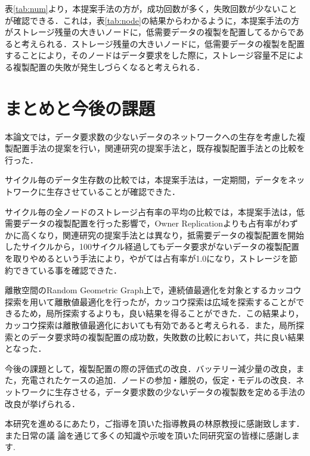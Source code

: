 \documentclass[11pt]{jreport}
\begin{document}
\par 表\ref{tab:num}より，本提案手法の方が，成功回数が多く，失敗回数が少ないことが確認できる．これは，表\ref{tab:node}の結果からわかるように，本提案手法の方がストレージ残量の大きいノードに，低需要データの複製を配置してるからであると考えられる．ストレージ残量の大きいノードに，低需要データの複製を配置することにより，そのノードはデータ要求をした際に，ストレージ容量不足による複製配置の失敗が発生しづらくなると考えられる．

\chapter{まとめと今後の課題}
本論文では，データ要求数の少ないデータのネットワークへの生存を考慮した複製配置手法の提案を行い，関連研究の提案手法と，既存複製配置手法との比較を行った．
\par サイクル毎のデータ生存数の比較では，本提案手法は，一定期間，データをネットワークに生存させていることが確認できた．
\par サイクル毎の全ノードのストレージ占有率の平均の比較では，本提案手法は，低需要データの複製配置を行った影響で，Owner Replicationよりも占有率がわずかに高くなり，関連研究の提案手法とは異なり，抵需要データの複製配置を開始したサイクルから，100サイクル経過してもデータ要求がないデータの複製配置を取りやめるという手法により，やがては占有率が1.0になり，ストレージを節約できている事を確認できた．
\par 離散空間のRandom Geometric Graph上で，連続値最適化を対象とするカッコウ探索を用いて離散値最適化を行ったが，カッコウ探索は広域を探索することができるため，局所探索するよりも，良い結果を得ることができた．この結果より，カッコウ探索は離散値最適化においても有効であると考えられる．また，局所探索とのデータ要求時の複製配置の成功数，失敗数の比較において，共に良い結果となった．
\par 今後の課題として，複製配置の際の評価式の改良．バッテリー減少量の改良，また，充電されたケースの追加．ノードの参加・離脱の，仮定・モデルの改良．ネットワークに生存させる，データ要求数の少ないデータの複製数を定める手法の改良が挙げられる．




 \begin{acknowledgements}
 本研究を進めるにあたり，ご指導を頂いた指導教員の林原教授に感謝致します．また日常の議 論を通じて多くの知識や示唆を頂いた同研究室の皆様に感謝します.
 \end{acknowledgements}
\end{document}
